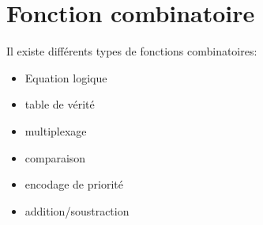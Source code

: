 

    
    
    
    
    
    

\section{Fonction combinatoire}

Il existe différents types de fonctions combinatoires:
\begin{itemize}
    \item Equation logique
    \item table de vérité
    \item multiplexage
    \item comparaison
    \item encodage de priorité
    \item addition/soustraction
\end{itemize}

